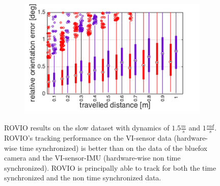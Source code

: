 \begin{figure}[h]
\begin{subfigure}[b]{0.42\textwidth}
    \caption{}
  \end{subfigure}
  \hfill
  \begin{subfigure}[b]{0.42\textwidth}
    \includegraphics[width=\textwidth]{images/slow/slow_roe.png}
    \caption{}
  \end{subfigure}
   \caption{ROVIO results on the slow dataset with dynamics of $1.5\frac{m}{s}$ and $1\frac{rad}{s}$. ROVIO's tracking performance on the VI-sensor data (hardware-wise time synchronized) is better than on the data of the bluefox camera and the VI-sensor-IMU (hardware-wise non time synchronized). ROVIO is principally able to track for both the time synchronized and the non time synchronized data.}
   \label{pics:appendix_slow}
\end{figure}

